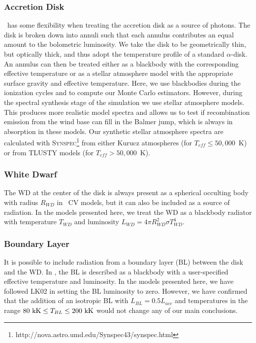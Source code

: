 \documentclass[preprint, a4paper, 11pt]{aastex}
\begin{document}
\subsubsection{Accretion Disk}

\py\ has some flexibility when treating the accretion 
disk as a source of photons. The disk is broken down into annuli 
such that each annulus contributes an equal amount to the bolometric
luminosity. We take the disk to be geometrically thin, but optically
thick, and thus adopt the temperature profile of a standard
\cite{shakurasunyaev1973} $\alpha$-disk. An annulus can then
be treated either as a blackbody with the corresponding effective
temperature or as a stellar atmosphere model with the appropriate
surface gravity and effective temperature. Here, we use blackbodies 
during the ionization cycles and to compute our Monte Carlo
estimators. However, during the spectral synthesis stage of the 
simulation we use stellar atmosphere models. This produces more
realistic model spectra and allows us to test if recombination
emission from the wind base can fill in the Balmer jump, which is
always in absorption in these models. Our synthetic stellar atmosphere
spectra are calculated with
\textsc{Synspec}\footnote{http://nova.astro.umd.edu/Synspec43/synspec.html}
from either Kurucz \citep{kurucz1991} atmospheres (for $T_{eff} \leq
50,000$~K) or from \textsc{TLUSTY} \citep{tlusty} models (for $T_{eff} > 50,000$~K). 

\subsubsection{White Dwarf}

The WD at the center of the disk is always present as a spherical occulting
body with radius $R_{WD}$ in \py\ CV models, but it can also be included
as a source of radiation. In the models presented here, we treat the
WD as a blackbody radiator with temperature $T_{WD}$ and luminosity
$L_{WD} = 4\pi R_{WD}^2 \sigma T_{WD}^4$. 

\subsubsection{Boundary Layer}

It is possible to include radiation from a boundary layer (BL) between
the disk and the WD. In \py, the BL is described as
a blackbody with a user-specified effective temperature and
luminosity. In the models presented here, we have followed LK02 in setting
the BL luminosity to zero. However, we have confirmed that the addition of an isotropic
BL with $L_{BL} = 0.5 L_{acc}$ and temperatures in the range $80~{\rm
kK} \leq T_{BL} \leq 200~{\rm kK}$ would not change any of our main
conclusions. 
\end{document}
